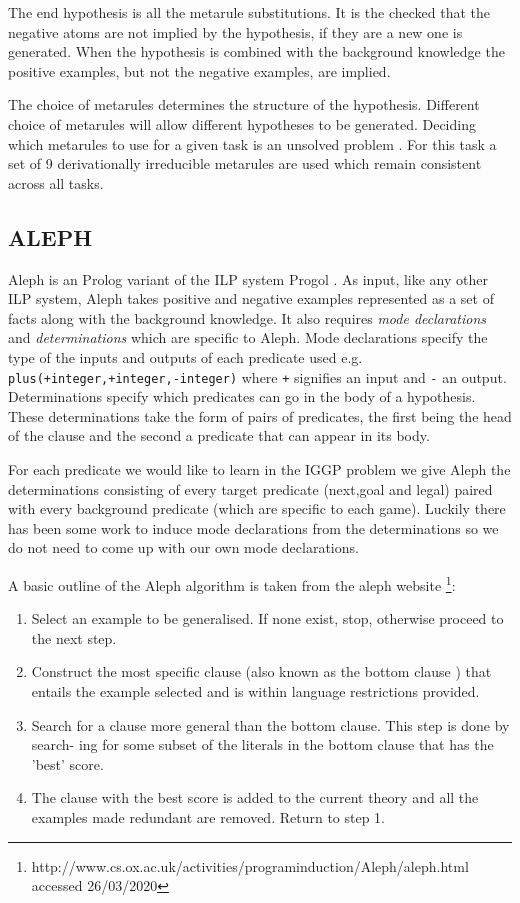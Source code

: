 The end hypothesis is all the metarule substitutions. It is the checked that the negative atoms are not implied by the hypothesis, if they are a new one is generated. When the hypothesis is combined with the background knowledge the positive examples, but not the negative examples, are implied.

The choice of metarules determines the structure of the hypothesis. Different choice of metarules will allow different hypotheses to be generated. Deciding which metarules to use for a given task is an unsolved problem \cite{Cropper/Thesis}. For this task a set of 9 derivationally irreducible metarules are used which remain consistent across all tasks.
\subsection{ALEPH}
Aleph is an Prolog variant of the ILP system Progol \cite{Muggleton/Aleph}. As input, like any other ILP system, Aleph takes positive and negative examples represented as a set of facts along with the background knowledge. It also requires \textit{mode declarations} and \textit{determinations} which are specific to Aleph. Mode declarations specify the type of the inputs and outputs of each predicate used e.g. \texttt{plus(+integer,+integer,-integer)} where \texttt{+} signifies an input and \texttt{-} an output.
Determinations specify which predicates can go in the body of a hypothesis. These determinations take the form of pairs of predicates, the first being the head of the clause and the second a predicate that can appear in its body.

For each predicate we would like to learn in the IGGP problem we give Aleph the determinations consisting of every target predicate (next,goal and legal) paired with every background predicate (which are specific to each game). Luckily there has been some work to induce mode declarations from the determinations \cite{McCreath/Meta-extraction} so we do not need to come up with our own mode declarations.

A basic outline of the Aleph algorithm is taken from the aleph website \footnote{http://www.cs.ox.ac.uk/activities/programinduction/Aleph/aleph.html accessed 26/03/2020}:
\begin{enumerate}
\item Select an example to be generalised. If none exist, stop, otherwise proceed to the
next step.
\item Construct the most specific clause (also known as the bottom clause \cite{Muggleton/Aleph}) that entails
the example selected and is within language restrictions provided.
\item Search for a clause more general than the bottom clause. This step is done by search-
ing for some subset of the literals in the bottom clause that has the 'best' score.
\item The clause with the best score is added to the current theory and all the examples
made redundant are removed. Return to step 1.
\end{enumerate}

